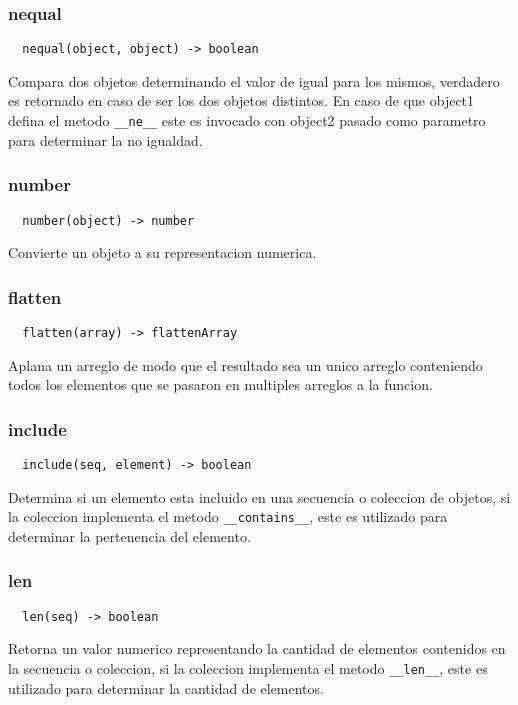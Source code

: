 \subsubsection*{nequal}
\begin{verbatim}
  nequal(object, object) -> boolean
\end{verbatim}
Compara dos objetos determinando el valor de igual para los mismos, verdadero es
retornado en caso de ser los dos objetos distintos.
En caso de que object1 defina el metodo \verb|__ne__| este es invocado con
object2 pasado como parametro para determinar la no igualdad.

\subsubsection*{number}
\begin{verbatim}
  number(object) -> number
\end{verbatim}
Convierte un objeto a su representacion numerica.

\subsubsection*{flatten}
\begin{verbatim}
  flatten(array) -> flattenArray
\end{verbatim}
Aplana un arreglo de modo que el resultado sea un unico arreglo conteniendo
todos los elementos que se pasaron en multiples arreglos a la funcion.

\subsubsection*{include}
\begin{verbatim}
  include(seq, element) -> boolean
\end{verbatim}
Determina si un elemento esta incluido en una secuencia o coleccion de objetos,
si la coleccion implementa el metodo \verb|__contains__|, este es utilizado para
determinar la pertenencia del elemento.

\subsubsection*{len}
\begin{verbatim}
  len(seq) -> boolean
\end{verbatim}
Retorna un valor numerico representando la cantidad de elementos contenidos en
la secuencia o coleccion, si la coleccion implementa el metodo \verb|__len__|,
este es utilizado para determinar la cantidad de elementos.

